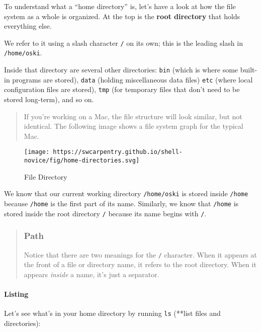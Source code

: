 \documentclass[
]{book}
\begin{document}
To understand what a ``home directory'' is, let's have a look at how the file system as a whole is organized. At the top is the \textbf{root directory} that holds everything else.

We refer to it using a slash character \texttt{/} on its own; this is the leading slash in \texttt{/home/oski}.

Inside that directory are several other directories: \texttt{bin} (which is where some built-in programs are stored), \texttt{data} (holding miscellaneous data files) \texttt{etc} (where local configuration files are stored), \texttt{tmp} (for temporary files that don't need to be stored long-term), and so on.

\begin{quote}
If you're working on a Mac, the file structure will look similar, but not
identical. The following image shows a file system graph for the typical Mac.
\end{quote}

\begin{figure}
\centering
\texttt{[image: https://swcarpentry.github.io/shell-novice/fig/home-directories.svg]}
\caption{File Directory}
\end{figure}

We know that our current working directory \texttt{/home/oski} is stored inside \texttt{/home} because \texttt{/home} is the first part of its name. Similarly, we know that \texttt{/home} is stored inside the root directory \texttt{/} because its name begins with \texttt{/}.

\begin{quote}
\hypertarget{path}{%
\subsubsection{Path}\label{path}}

Notice that there are two meanings for the \texttt{/} character.
When it appears at the front of a file or directory name, it refers to the root directory. When it appears \emph{inside} a name, it's just a separator.
\end{quote}

\hypertarget{listing}{%
\paragraph{Listing}\label{listing}}

Let's see what's in your home directory by running \texttt{ls} (**list files and directories):
\end{document}
